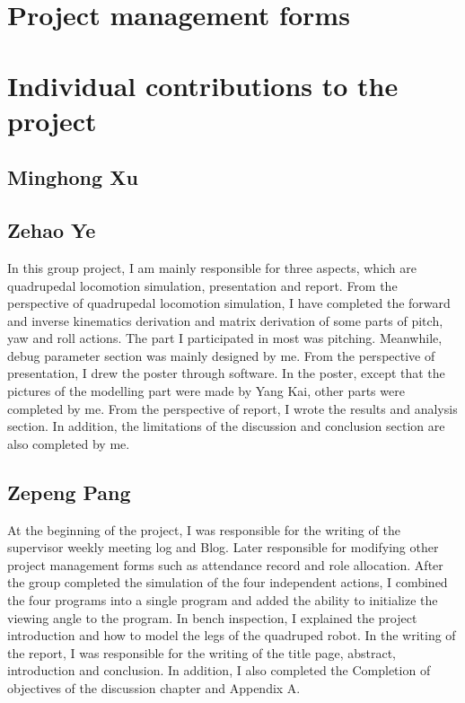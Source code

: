 \newpage
\appendix
\appendixpage
\addappheadtotoc


\chapter{Project management forms}









\chapter{Individual contributions to the project}
\section{Minghong Xu}
\section{Zehao Ye}
In this group project, I am mainly responsible for three aspects, which are quadrupedal locomotion simulation, presentation and report. From the perspective of quadrupedal locomotion simulation, I have completed the forward and inverse kinematics derivation and matrix derivation of some parts of pitch, yaw and roll actions. The part I participated in most was pitching. Meanwhile, debug parameter section was mainly designed by me. From the perspective of presentation, I drew the poster through software. In the poster, except that the pictures of the modelling part were made by Yang Kai, other parts were completed by me. From the perspective of report, I wrote the results and analysis section. In addition, the limitations of the discussion and conclusion section are also completed by me.

\section{Zepeng Pang}

At the beginning of the project, I was responsible for the writing of the supervisor weekly meeting log and Blog. Later responsible for modifying other project management forms such as attendance record and role allocation. After the group completed the simulation of the four independent actions, I combined the four programs into a single program and added the ability to initialize the viewing angle to the program. In bench inspection, I explained the project introduction and how to model the legs of the quadruped robot. In the writing of the report, I was responsible for the writing of the title page, abstract, introduction and conclusion. In addition, I also completed the Completion of objectives of the discussion chapter and Appendix A.

